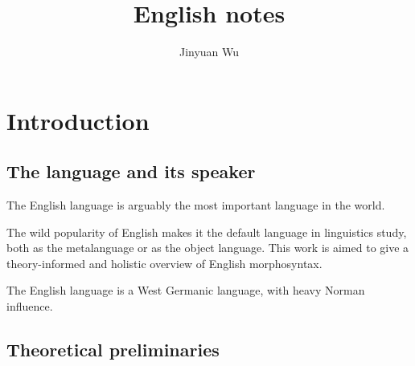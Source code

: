 \documentclass[UTF8, a4paper, oneside, scheme=plain]{ctexrep}
\title{English notes}
\author{Jinyuan Wu}
\begin{document}
    
\maketitle

\automath

\tableofcontents

\chapter{Introduction}

\setcounter{page}{1}

\section{The language and its speaker}

The English language is arguably the most important language in the world.

The wild popularity of English 
makes it the default language in linguistics study,
both as the metalanguage or as the object language.
This work is aimed to give a theory-informed and holistic overview of English morphosyntax.

The English language is a West Germanic language,
with heavy Norman influence. 

\section{Theoretical preliminaries}
\end{document}
